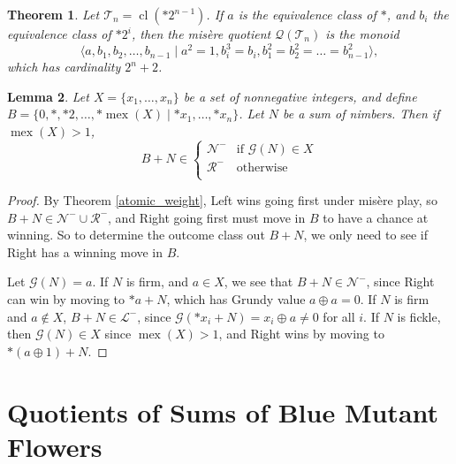 \documentclass{amsart}
\theoremstyle{plain}
\newtheorem{thm}{Theorem}
\newtheorem{lemma}[thm]{Lemma}
\theoremstyle{definition}
\theoremstyle{remark}
\numberwithin{equation}{section}
\numberwithin{thm}{section}
\DeclareMathOperator{\cl}{cl}
\DeclareMathOperator{\mex}{mex}
\begin{document}
\begin{thm}
  \label{tame} 
    Let $\mathscr{T}_n = \cl (*2^{n-1})$. If $a$ is the equivalence class of $*$, and $b_i$ the equivalence class of $*2^i$, then the mis\`ere quotient $\mathcal{Q}(\mathscr{T}_n)$ is the monoid \begin{equation*}
        \langle a, b_1,b_2,\dots, b_{n-1} \mid a^2 = 1,b_i^3 = b_i,b_1^2 = b^2_2 = \dots = b_{n-1}^2 \rangle,
    \end{equation*}
which has cardinality $2^{n}+2$.
\end{thm}


\begin{lemma}
    \label{eval}
    Let $X = \{x_1 ,\dots,x_n\}$ be a set of nonnegative integers, and define $B = \{  0,* ,*2,\dots, *\mex (X) \mid *x_1,\dots,*x_n\}$. Let $N$ be a sum of nimbers. Then if $\mex(X) > 1$, \begin{equation}
        B +N \in \begin{cases}
            \mathcal{N}^- & \text{if } \mathcal{G}(N) \in X \\ 
            \mathcal{R}^- & \text{otherwise}\\
            
        \end{cases}
    \end{equation}
\end{lemma}
\begin{proof}
    By Theorem \ref{atomic_weight}, Left wins going first under mis\`ere play, so $B+N \in \mathcal{N}^-\cup \mathcal{R}^-$, and Right going first must move in $B$ to have a chance at winning. So to determine the outcome class out $B+N$, we only need to see if Right has a winning move in $B$.

Let $\mathcal{G}(N) = a$. If $N$ is firm, and $a \in X$, we see that $B+N \in \mathcal{N}^-$, since Right can win by moving to $*a +N$, which has Grundy value $a \oplus a = 0$.  If $N$ is firm and $a \not \in X$, $B+N \in \mathcal{L}^-$, since $\mathcal{G}(*x_i + N) = x_i \oplus a \neq 0 $ for all $i$. If $N$ is fickle, then $\mathcal{G}(N) \in X$ since $\mex(X)>1$, and Right wins by moving to $*(a \oplus 1) + N$.
\end{proof}

\section{Quotients of Sums of Blue Mutant Flowers}

\label{construction} 
\end{document}

